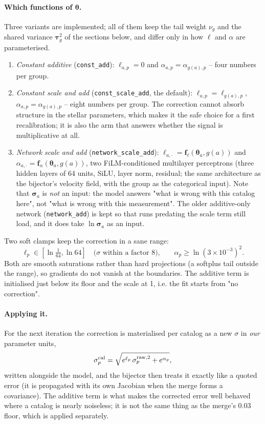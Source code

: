 \documentclass[11pt,a4paper]{article}
\newcommand{\bv}[1]{\boldsymbol{#1}}          %
\begin{document}
\paragraph{Which functions of $\bv\theta$.} Three variants are implemented; all of
them keep the tail weight $\nu_g$ and the shared variance $\bv\tau_g^2$ of the
sections below, and differ only in how $\ell$ and $\alpha$ are parameterised.
\begin{enumerate}
  \item \emph{Constant additive} (\texttt{const\_add}): $\ell_{a,p} = 0$ and
  $\alpha_{a,p} = \alpha_{g(a),p}$ -- four numbers per group.
  \item \emph{Constant scale and add} (\texttt{const\_scale\_add}, the default):
  $\ell_{a,p} = \ell_{g(a),p}$, $\alpha_{a,p} = \alpha_{g(a),p}$ -- eight numbers
  per group. The correction cannot absorb structure in the stellar parameters,
  which makes it the safe choice for a first recalibration; it is also the arm
  that answers whether the signal is multiplicative at all.
  \item \emph{Network scale and add} (\texttt{network\_scale\_add}):
  $\ell_{a,\cdot} = \bv f_\ell(\bv\theta_a, g(a))$ and
  $\alpha_{a,\cdot} = \bv f_\alpha(\bv\theta_a, g(a))$, two FiLM-conditioned
  multilayer perceptrons (three hidden layers of 64 units, SiLU, layer norm,
  residual; the same architecture as the bijector's velocity field, with the
  group as the categorical input). Note that $\bv\sigma_a$ is \emph{not} an input:
  the model answers "what is wrong with this catalog here", not "what is wrong
  with this measurement". The older additive-only network
  (\texttt{network\_add}) is kept so that runs predating the scale term still
  load, and it does take $\ln\bv\sigma_a$ as an input.
\end{enumerate}
Two soft clamps keep the correction in a sane range:
\begin{equation}
  \ell_p \in [\ln\tfrac{1}{64}, \ln 64] \quad\text{($\sigma$ within a factor 8),}
  \qquad
  \alpha_p \ge \ln (3\times 10^{-3})^2 .
\end{equation}
Both are smooth saturations rather than hard projections (a softplus tail outside
the range), so gradients do not vanish at the boundaries. The additive term is
initialised just below its floor and the scale at 1, i.e. the fit starts from "no
correction".

\paragraph{Applying it.} For the next iteration the correction is materialised per
catalog as a new $\sigma$ in \emph{our} parameter units,
\begin{equation}
  \sigma^{\rm cal}_{p} = \sqrt{e^{\ell_{p}}\,\sigma^{\rm raw,2}_{p} + e^{\alpha_{p}}},
\end{equation}
written alongside the model, and the bijector then treats it exactly like a quoted
error (it is propagated with its own Jacobian when the merge forms a covariance).
The additive term is what makes the corrected error well behaved where a catalog
is nearly noiseless; it is not the same thing as the merge's $0.03$ floor, which
is applied separately.
\end{document}
